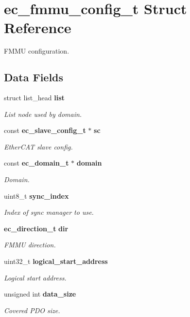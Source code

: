 \section{ec\-\_\-fmmu\-\_\-config\-\_\-t Struct Reference}
\label{structec__fmmu__config__t}


F\-M\-M\-U configuration.  


\subsection*{Data Fields}
\begin{DoxyCompactItemize}
\item 
struct list\-\_\-head {\bf list}
\begin{DoxyCompactList}\small\item\em List node used by domain. \end{DoxyCompactList}\item 
const {\bf ec\-\_\-slave\-\_\-config\-\_\-t} $\ast$ {\bf sc}
\begin{DoxyCompactList}\small\item\em Ether\-C\-A\-T slave config. \end{DoxyCompactList}\item 
const {\bf ec\-\_\-domain\-\_\-t} $\ast$ {\bf domain}
\begin{DoxyCompactList}\small\item\em Domain. \end{DoxyCompactList}\item 
uint8\-\_\-t {\bf sync\-\_\-index}
\begin{DoxyCompactList}\small\item\em Index of sync manager to use. \end{DoxyCompactList}\item 
{\bf ec\-\_\-direction\-\_\-t} {\bf dir}
\begin{DoxyCompactList}\small\item\em F\-M\-M\-U direction. \end{DoxyCompactList}\item 
uint32\-\_\-t {\bf logical\-\_\-start\-\_\-address}
\begin{DoxyCompactList}\small\item\em Logical start address. \end{DoxyCompactList}\item 
unsigned int {\bf data\-\_\-size}
\begin{DoxyCompactList}\small\item\em Covered P\-D\-O size. \end{DoxyCompactList}\end{DoxyCompactItemize}


